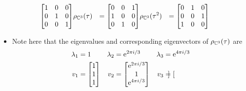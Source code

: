 \documentclass[../notes.tex]{subfiles}
\begin{document}
\begin{itemize}
\begin{itemize}
\begin{enumerate}
\begin{align*}
                \begin{bmatrix}
                    1 & 0 & 0\\
                    0 & 1 & 0\\
                    0 & 0 & 1\\
                \end{bmatrix}&
                \rho_{\C^3}(\tau) &=
                \begin{bmatrix}
                    0 & 0 & 1\\
                    1 & 0 & 0\\
                    0 & 1 & 0\\
                \end{bmatrix}&
                \rho_{\C^3}(\tau^2) &=
                \begin{bmatrix}
                    0 & 1 & 0\\
                    0 & 0 & 1\\
                    1 & 0 & 0\\
                \end{bmatrix}
            \end{align*}
            \begin{itemize}
                \item Note here that the eigenvalues and corresponding eigenvectors of $\rho_{\C^3}(\tau)$ are
                \begin{align*}
                    \lambda_1 &= 1&
                        \lambda_2 &= \e[2\pi i/3]&
                            \lambda_3 &= \e[4\pi i/3]\\
                    v_1 &=
                    \begin{bmatrix}
                        1\\
                        1\\
                        1\\
                    \end{bmatrix}&
                        v_2 &=
                        \begin{bmatrix}
                            \e[2\pi i/3]\\
                            1\\
                            \e[4\pi i/3]\\
                        \end{bmatrix}&
                            v_3 &=
                            \begin{bmatrix}

\end{bmatrix}
\end{align*}
\end{itemize}
\end{enumerate}
\end{itemize}
\end{itemize}
\end{document}
